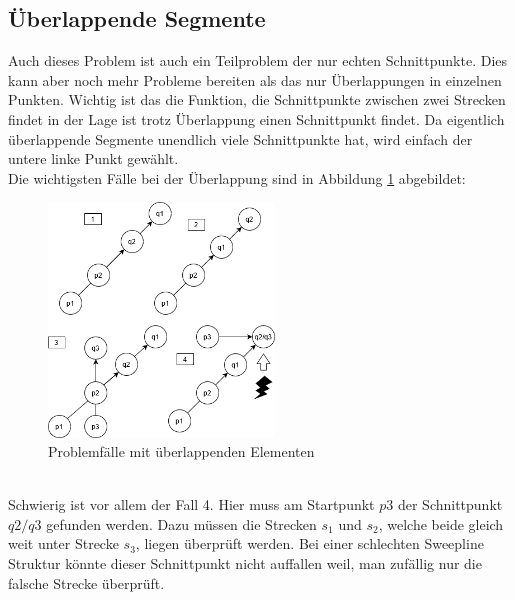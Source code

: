 \documentclass[conference]{IEEEtran}
\begin{document}
	\subsection{Überlappende Segmente}
	Auch dieses Problem ist auch ein Teilproblem der nur echten Schnittpunkte. Dies kann aber noch mehr Probleme bereiten als das nur Überlappungen in einzelnen Punkten. Wichtig ist das die Funktion, die Schnittpunkte zwischen zwei Strecken findet in der Lage ist trotz Überlappung einen Schnittpunkt findet. Da eigentlich überlappende Segmente unendlich viele Schnittpunkte hat, wird einfach der untere linke Punkt gewählt.\\
	Die wichtigsten Fälle bei der Überlappung sind in Abbildung \ref{uberlap} abgebildet:
	\begin{figure}[h]
		\begin{center}
			\includegraphics[width=6cm]{ProblemUberlappen.png}
			\caption{Problemfälle mit überlappenden Elementen}
			\label{uberlap}
		\end{center}
	\end{figure}\\
	Schwierig ist vor allem der Fall 4. Hier muss am Startpunkt $p3$ der Schnittpunkt $q2/q3$ gefunden werden. Dazu müssen die Strecken $s_1$ und $s_2$, welche beide gleich weit unter Strecke $s_3$, liegen überprüft werden. Bei einer schlechten Sweepline Struktur könnte dieser Schnittpunkt nicht auffallen weil, man zufällig nur die falsche Strecke überprüft.
	
\end{document}
